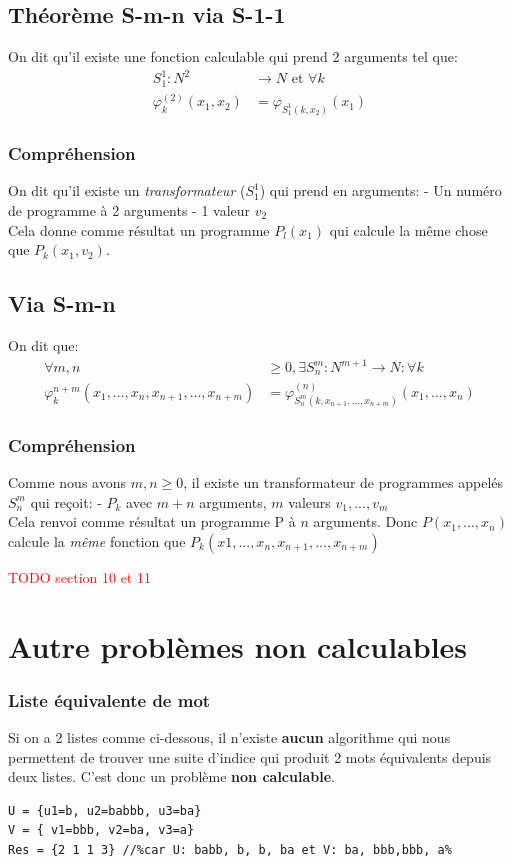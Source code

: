 \documentclass{report}
\begin{document}
\subsection{Théorème S-m-n via S-1-1}
On dit qu'il existe une fonction calculable qui prend 2 arguments tel que:
\begin{align*}
S_1^1 : N^2 &\rightarrow N \text{ et } \forall k\\
\varphi_k^{(2)} (x_1, x_2) &= \varphi_{S_1^1 (k,x_2)} (x_1)
\end{align*}
\subsubsection{Compréhension}
On dit qu'il existe un \textit{transformateur} ($S_1^1$) qui prend en arguments: - Un numéro de programme à 2 arguments - 1 valeur $v_2$\\
Cela donne comme résultat un programme $P_l(x_1)$ qui calcule la même chose que $P_k(x_1,v_2)$.

\subsection{Via S-m-n}
On dit que:
\begin{align*}
\forall m, n &\geq 0, \exists S_n^m : N^{m+1} \rightarrow N : \forall k\\
\varphi_k^{n+m} (x_1, ..., x_n, x_{n+1}, ..., x_{n+m}) &= \varphi_{S_n^m (k, x_{n+1}, ..., x_{n+m})}^{(n)} (x_1, ..., x_n)
\end{align*}
\subsubsection{Compréhension}
Comme nous avons $m,n \geq 0$, il existe un transformateur de programmes appelés $S_n^m$ qui reçoit: - $P_k$ avec $m+n$ arguments, $m$ valeurs $v_1, ..., v_m$\\
Cela renvoi comme résultat un programme P à $n$ arguments. Donc $P(x_1, ..., x_n)$ calcule la \textit{même} fonction que $P_k(x1, ..., x_n, x_{n+1}, ..., x_{n+m})$



\textcolor{red}{TODO section 10 et 11}

\section{Autre problèmes non calculables}
\subsubsection{Liste équivalente de mot}
Si on a 2 listes comme ci-dessous, il n'existe \textbf{aucun} algorithme qui nous permettent de trouver une suite d'indice qui produit 2 mots équivalents depuis deux listes. C'est donc un problème \textbf{non calculable}.
\begin{lstlisting}[escapechar=\%]
%$\Sigma$% = {a,b} 
U = {u1=b, u2=babbb, u3=ba}
V = { v1=bbb, v2=ba, v3=a}
Res = {2 1 1 3} //%car U: babb, b, b, ba et V: ba, bbb,bbb, a%
\end{lstlisting}
\end{document}
